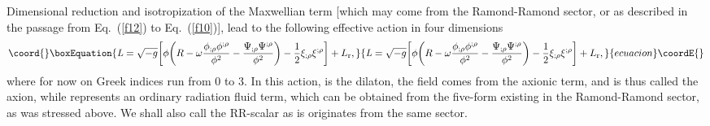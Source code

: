 \documentclass[a4paper,aps,twocolumn,prd,showpacs,nofootinbib]{revtex4}
\providecommand{\ee}{\mathrm{e}}
\begin{document}
Dimensional reduction and isotropization of the Maxwellian term [which
may come from the Ramond-Ramond sector, or as described in the passage
from Eq.~(\ref{f12}) to Eq.~(\ref{f10})], lead to the following
effective action in four dimensions
\begin{equation}\coord{}\boxEquation{
\label{l1} {\it L} = \sqrt{-g}\biggl[\phi\biggl(R -
\omega\frac{\phi_{;\rho}\phi^{;\rho}}{\phi^2} -
\frac{\Psi_{;\rho}\Psi^{;\rho}}{\phi^{2}}\biggr) -
\frac{1}{2}\xi_{;\rho}\xi^{;\rho}\biggr] + L_{\rm r},
}{
{\it L} = \sqrt{-g}\biggl[\phi\biggl(R -
\omega\frac{\phi_{;\rho}\phi^{;\rho}}{\phi^2} -
\frac{\Psi_{;\rho}\Psi^{;\rho}}{\phi^{2}}\biggr) -
\frac{1}{2}\xi_{;\rho}\xi^{;\rho}\biggr] + L_{\rm r},
}{ecuacion}\coordE{}\end{equation}
where for now on Greek indices run from 0 to 3.  In this action, \myHighlight{$\phi
= \ee^{-\tilde\sigma}$}\coordHE{} is the dilaton, the field \myHighlight{$\Psi$}\coordHE{} comes from the
axionic term, and is thus called the axion, while \coordHE{}
represents an ordinary radiation fluid term, which can be obtained
from the five-form existing in the Ramond-Ramond sector, as was
stressed above. We shall also call \myHighlight{$\xi$}\coordHE{} the RR-scalar as is
originates from the same sector.
\end{document}
